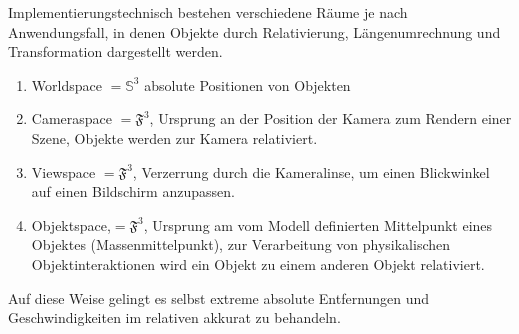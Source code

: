 Implementierungstechnisch bestehen verschiedene Räume je nach Anwendungsfall, in denen Objekte durch Relativierung, Längenumrechnung und Transformation dargestellt werden.

\begin{enumerate}
\item Worldspace $= \mathbb{S}^3$ absolute Positionen von Objekten
\item Cameraspace $= \mathfrak{F}^3$, Ursprung an der Position der Kamera zum Rendern einer Szene, Objekte werden zur Kamera relativiert.
\item Viewspace $= \mathfrak{F}^3$, Verzerrung durch die Kameralinse, um einen Blickwinkel auf einen Bildschirm anzupassen.
\item Objektspace,$= \mathfrak{F}^3$, Ursprung am vom Modell definierten Mittelpunkt eines Objektes (Massenmittelpunkt), zur Verarbeitung von physikalischen Objektinteraktionen wird ein Objekt zu einem anderen Objekt relativiert.
\end{enumerate}

Auf diese Weise gelingt es selbst extreme absolute Entfernungen und Geschwindigkeiten im relativen akkurat zu behandeln.


